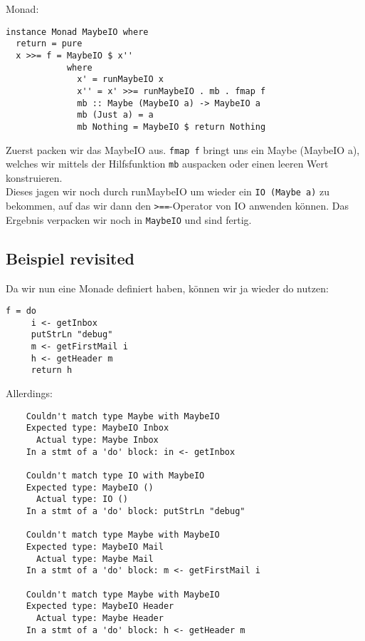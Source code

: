 \documentclass{beamer}
\begin{document}
\begin{frame}[fragile]
Monad:
\begin{verbatim}
instance Monad MaybeIO where
  return = pure
  x >>= f = MaybeIO $ x''
            where
              x' = runMaybeIO x
              x'' = x' >>= runMaybeIO . mb . fmap f
              mb :: Maybe (MaybeIO a) -> MaybeIO a
              mb (Just a) = a
              mb Nothing = MaybeIO $ return Nothing
\end{verbatim}
Zuerst packen wir das MaybeIO aus. \texttt{fmap f} bringt uns ein Maybe (MaybeIO a), welches wir mittels der Hilfsfunktion \texttt{mb} auspacken oder einen leeren Wert konstruieren.\\
Dieses jagen wir noch durch runMaybeIO um wieder ein \texttt{IO (Maybe a)} zu bekommen, auf das wir dann den \texttt{>==}-Operator von IO anwenden können. Das Ergebnis verpacken wir noch in \texttt{MaybeIO} und sind fertig.
\end{frame}

\subsection{Beispiel revisited}
\begin{frame}[fragile]
Da wir nun eine Monade definiert haben, können wir ja wieder do nutzen:
\begin{verbatim}
f = do
     i <- getInbox
     putStrLn "debug"
     m <- getFirstMail i
     h <- getHeader m
     return h
\end{verbatim}
\end{frame}
\begin{frame}[fragile]
Allerdings:
\begin{verbatim}
    Couldn't match type Maybe with MaybeIO
    Expected type: MaybeIO Inbox
      Actual type: Maybe Inbox
    In a stmt of a 'do' block: in <- getInbox

    Couldn't match type IO with MaybeIO
    Expected type: MaybeIO ()
      Actual type: IO ()
    In a stmt of a 'do' block: putStrLn "debug"

    Couldn't match type Maybe with MaybeIO
    Expected type: MaybeIO Mail
      Actual type: Maybe Mail
    In a stmt of a 'do' block: m <- getFirstMail i
    
    Couldn't match type Maybe with MaybeIO
    Expected type: MaybeIO Header
      Actual type: Maybe Header
    In a stmt of a 'do' block: h <- getHeader m
\end{verbatim}
\end{frame}
\end{document}
